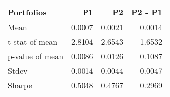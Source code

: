 \begin{tabular}{lrrr}
\toprule
Portfolios & P1 & P2 & P2 - P1 \\
\midrule
Mean & 0.0007 & 0.0021 & 0.0014 \\
t-stat of mean & 2.8104 & 2.6543 & 1.6532 \\
p-value of mean & 0.0086 & 0.0126 & 0.1087 \\
Stdev & 0.0014 & 0.0044 & 0.0047 \\
Sharpe & 0.5048 & 0.4767 & 0.2969 \\
\bottomrule
\end{tabular}
